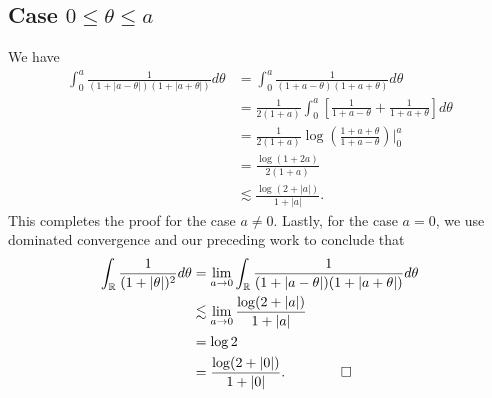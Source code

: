 \documentclass[12pt,reqno]{amsart}
\numberwithin{equation}{section}  %
\numberwithin{figure}{section}
\newcommand{\rr}{\mathbb{R}}
\theoremstyle{plain}
\theoremstyle{definition}
\theoremstyle{remark}
\begin{document}
\subsection{Case $0 \le \theta \le a$}
We have
%
%
\begin{equation*}
	\begin{split}
		\int_{0}^{a} \frac{1}{(1 + | a - \theta |)(1 + | a + \theta |)}d \theta
		& = \int_{0}^{a} \frac{1}{(1 +  a - \theta )(1 +  a + \theta )}d \theta
		\\
		& = \frac{1}{2(1 + a)} \int_{0}^{a} \left[ \frac{1}{1 + a - \theta} +
		\frac{1}{1 + a + \theta} \right]d \theta
		\\
		& = \frac{1}{2(1 + a)} \log \left( \frac{1 + a + \theta}{1 + a - \theta}
		\right) \Big |_{0}^{a}
		\\
		& = \frac{\log\left( 1 + 2a \right)}{2\left( 1 + a \right)}
		\\
		& \lesssim \frac{\log(2 + | a |)}{1 + | a |}.
	\end{split}
\end{equation*}
%
%
This completes the proof for the case $a \neq 0$. Lastly, for the case
$a =0$, we use dominated convergence and our preceding work to
conclude that
%
%
\begin{equation*}
	\begin{split}
		\int_{\rr} \frac{1}{(1 + | \theta|)^2} d \theta
		& = \lim_{a \to 0}
		\int_{\rr} \frac{1}{(1 + | a - \theta |)(1 + | a + \theta |)}d \theta
		\\
		& \lesssim \lim_{a \to 0} \frac{\log(2 + | a |)}{1 + | a |}
		\\
		& =  \log 2
		\\
		& = \frac{\log(2 + | 0 |)}{1 + | 0 |}. \qquad \qed
	\end{split}
\end{equation*}



%
%
\end{document}
